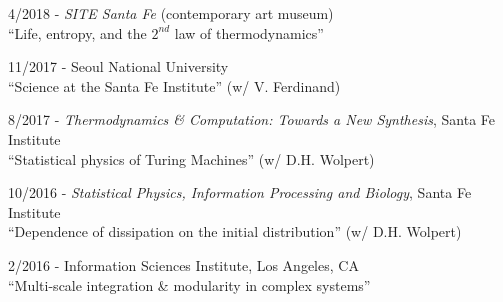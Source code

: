 \documentclass[margin,line,centered]{res}
\begin{document}
\begin{resume}
4/2018 - \emph{SITE Santa Fe} (contemporary art museum)\\
``Life, entropy, and the $2^{{nd}}$ law of thermodynamics''

11/2017 - Seoul National University\\
``Science at the Santa Fe Institute'' (w/ V. Ferdinand) %

8/2017 - \emph{Thermodynamics \& Computation: Towards a New Synthesis}, Santa Fe Institute\\
``Statistical physics of Turing Machines'' (w/ D.H. Wolpert) %

10/2016 - \emph{Statistical Physics, Information Processing and Biology}, Santa Fe Institute \\
``Dependence of dissipation on the initial distribution'' (w/ D.H. Wolpert) %

2/2016 - Information Sciences Institute, Los Angeles, CA\\
``Multi-scale integration \& modularity in complex systems'' %











\end{resume}
\end{document}
